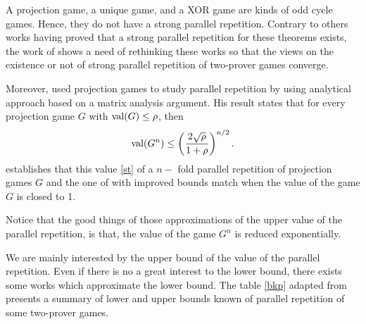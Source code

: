 A projection game, a unique game, and a XOR game are kinds of odd cycle games.
Hence, they do not have a strong parallel repetition. Contrary to others works
having proved that a strong parallel repetition for these theorems exists, the work of  \cite{raz2011counterexample} shows a need of rethinking these works so that the views on the existence or not of strong parallel repetition of  two-prover games converge. 

Moreover, \cite{dinur2014analytical} used projection games to study parallel repetition by using analytical approach based on a matrix analysis argument. His result states that for every projection game $G$ with $\mathrm{val} (G) \leq \rho$, then  \begin{align}
\mathrm{val} (G^n) \leq \left(\frac{2\sqrt{\rho}}{1+\rho} \right)^{n/2}. \label{st}
\end{align}
\cite{dinur2014analytical} establishes that this value \eqref{st} of a $n-$ fold parallel repetition of projection games $G$ and the one of \cite{rao2011parallel}
with improved bounds match when the value of the game $G$ is closed to 1.

Notice that the good things of those approximations of the upper value of the parallel repetition, is that,  the value of the game $G^n$ is reduced exponentially.

We are mainly interested by the upper bound of the value of the parallel repetition. Even if there is no a great interest to the lower bound,
there exists some works which approximate the lower bound. The table \eqref{bkp} adapted from \cite{tamaki2015parallel} presents a summary of lower and upper bounds known of parallel repetition of some two-prover games.

